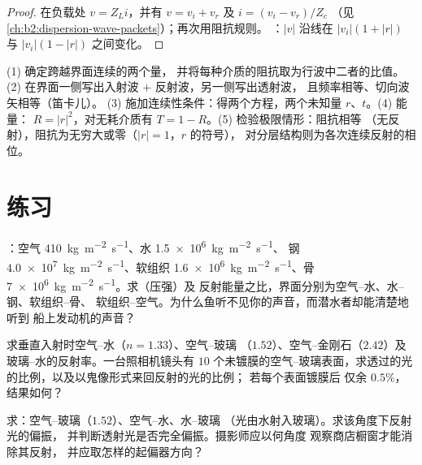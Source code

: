 \begin{proof}
在负载处 $v = Z_Li$，并有 $v = v_i + v_r$ 及 $i = (v_i - v_r)/Z_c$
（见\cref{ch:b2:dispersion-wave-packets}）；再次用阻抗规则。
：$|v|$ 沿线在 $|v_i|(1 + |r|)$ 与 $|v_i|(1 -
|r|)$ 之间变化。
\end{proof}

\begin{method}[任意界面]\label{met:b2:wave-interfaces:method}
(1) 确定跨越界面连续的两个量，
并将每种介质的阻抗取为行波中二者的比值。
(2) 在界面一侧写出入射波 $+$ 反射波，另一侧写出透射波，
且频率相等、切向波矢相等（笛卡儿）。
(3) 施加连续性条件：得两个方程，两个未知量 $r$、$t$。(4) 能量：
$R = |r|^2$，对无耗介质有 $T = 1 - R$。(5) 检验极限情形：阻抗相等
（无反射），阻抗为无穷大或零（$|r| = 1$，$r$ 的符号），
对分层结构则为各次连续反射的相位。
\end{method}

\section{练习}

\begin{exercise}[$\star$]\label{exo:b2:wave-interfaces:1}
：空气 \qty{410}{kg.m^{-2}.s^{-1}}、水 \qty{1.5e6}{kg.m^{-2}.s^{-1}}、
钢 \qty{4.0e7}{kg.m^{-2}.s^{-1}}、软组织 \qty{1.6e6}{kg.m^{-2}.s^{-1}}、骨
\qty{7e6}{kg.m^{-2}.s^{-1}}。求（压强）及
反射能量之比，界面分别为空气–水、水–钢、软组织–骨、
软组织–空气。为什么鱼听不见你的声音，而潜水者却能清楚地听到
船上发动机的声音？
\end{exercise}

\begin{exercise}[$\star$]\label{exo:b2:wave-interfaces:2}
求垂直入射时空气–水（$n = 1.33$）、空气–玻璃
（$1.52$）、空气–金刚石（$2.42$）及玻璃–水的反射率。一台照相机镜头有 $10$
个未镀膜的空气–玻璃表面，求透过的光的比例，以及以鬼像形式来回反射的光的比例；
若每个表面镀膜后
仅余 $0.5\%$，结果如何？
\end{exercise}

\begin{exercise}[$\star$]\label{exo:b2:wave-interfaces:3}
求：空气–玻璃（$1.52$）、空气–水、水–玻璃
（光由水射入玻璃）。求该角度下反射光的偏振，
并判断透射光是否完全偏振。摄影师应以何角度
观察商店橱窗才能消除其反射，
并应取怎样的起偏器方向？
\end{exercise}

